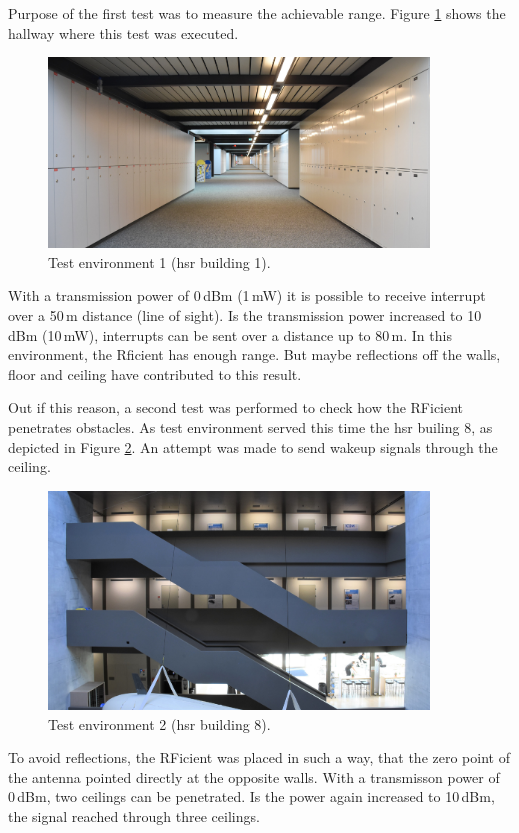 Purpose of the first test was to measure the achievable range.
Figure \ref{development:env1} shows the hallway where this test was executed.
\begin{figure}[ht]
	\centering
	\includegraphics[width=0.9\textwidth]{4-development/hardware/graphics/env/env1_c.pdf}
	\caption{Test environment 1 (\acs{hsr} building 1).\label{development:env1}}
\end{figure}
With a transmission power of 0\,dBm (1\,mW) it is possible to receive interrupt over a 50\,m distance (line of sight).
Is the transmission power increased to 10\,dBm (10\,mW), interrupts can be sent over a distance up to 80\,m.
In this environment, the Rficient has enough range.
But maybe reflections off the walls, floor and ceiling have contributed to this result.

Out if this reason, a second test was performed to check how the RFicient penetrates obstacles.
As test environment served this time the \acs{hsr} builing 8, as depicted in Figure \ref{development:env2}.
An attempt was made to send wakeup signals through the ceiling.
\begin{figure}[ht]
	\centering
	\includegraphics[width=0.9\textwidth]{4-development/hardware/graphics/env/env2_c.pdf}
	\caption{Test environment 2 (\acs{hsr} building 8).\label{development:env2}}
\end{figure}
To avoid reflections, the RFicient was placed in such a way, that the zero point of the antenna pointed directly at the opposite walls.
With a transmisson power of 0\,dBm, two ceilings can be penetrated.
Is the power again increased to 10\,dBm, the signal reached through three ceilings.


